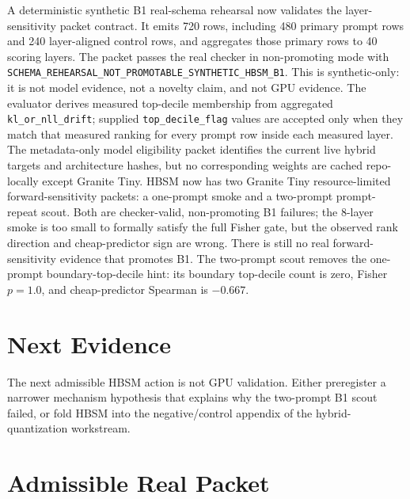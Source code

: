 \documentclass{article}
\begin{document}
A deterministic synthetic B1 real-schema rehearsal now validates the
layer-sensitivity packet contract. It emits 720 rows, including 480 primary
prompt rows and 240 layer-aligned control rows, and aggregates those primary rows to 40
scoring layers. The packet passes the real checker in non-promoting mode with
\texttt{SCHEMA\_REHEARSAL\_NOT\_PROMOTABLE\_SYNTHETIC\_HBSM\_B1}. This is
synthetic-only: it is not model evidence, not a novelty claim, and not GPU
evidence.
The evaluator derives measured top-decile membership from aggregated
\texttt{kl\_or\_nll\_drift}; supplied \texttt{top\_decile\_flag} values are
accepted only when they match that measured ranking for every prompt row inside
each measured layer.
The metadata-only model eligibility packet identifies the current live hybrid
targets and architecture hashes, but no corresponding weights are cached
repo-locally except Granite Tiny. HBSM now has two Granite Tiny
resource-limited forward-sensitivity packets: a one-prompt smoke and a
two-prompt prompt-repeat scout. Both are checker-valid, non-promoting B1
failures; the 8-layer smoke is too small to formally satisfy the full Fisher
gate, but the observed rank direction and cheap-predictor sign are wrong. There
is still no real forward-sensitivity evidence that promotes B1. The two-prompt
scout removes the one-prompt boundary-top-decile hint:
its boundary top-decile count is zero, Fisher \(p=1.0\), and cheap-predictor
Spearman is \(-0.667\).

\section{Next Evidence}

The next admissible HBSM action is not GPU validation. Either preregister a
narrower mechanism hypothesis that explains why the two-prompt B1 scout failed,
or fold HBSM into the negative/control appendix of the hybrid-quantization
workstream.

\section{Admissible Real Packet}
\end{document}
